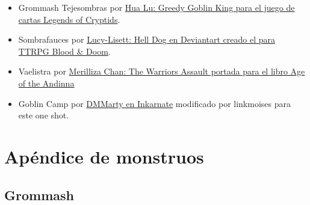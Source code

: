 \documentclass[10pt,twoside,twocolumn,openany]{dndbook}
\begin{document}
\begin{itemize}
  \item Grommash Tejesombras por \href{https://legendofthecryptids.fandom.com/wiki/Greedy_Goblin_King}{Hua Lu: Greedy Goblin King para el juego de cartas Legends of Cryptids}.
  \item Sombrafauces por \href{https://www.deviantart.com/lucy-lisett/art/Death-Dog-901248620}{Lucy-Lisett: Hell Dog en Deviantart creado el para TTRPG Blood \& Doom}.
  \item Vaelistra por \href{https://www.artstation.com/artwork/aRZ92J}{Merilliza Chan: The Warriors Assault portada para el libro Age of the Andinna}
  \item Goblin Camp por \href{https://inkarnate.com/m/zkNwn5--goblin-camp/}{DMMarty en Inkarnate} modificado por linkmoises para este one shot.
\end{itemize}

\part*{Apéndice de monstruos}

\chapter*{Grommash}


\end{document}
